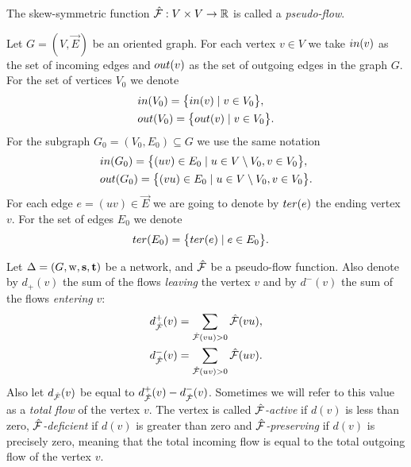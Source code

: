 \documentclass[12pt]{amsart}
\begin{document}
    \begin{definition}
        The skew-symmetric function $\mathcal{\hat{F}}: V \times V \to \mathbb{R}$ is called a \emph{pseudo-flow}.
    \end{definition}
    \begin{definition}
      Let $G = (V, \vec{E})$ be an oriented graph.
      For each vertex $v \in V$ we take $in(v)$ as the set of incoming edges
      and $out(v)$ as the set of outgoing edges in the graph $G$.
      For the set of vertices $V_0$ we denote
      \begin{align*}
        &in(V_0) = \big\{in(v) \mid v\in V_0\big\},\\
        &out(V_0) = \big\{out(v) \mid v\in V_0\big\}.
      \end{align*}
      For the subgraph $G_0 = (V_0, E_0) \subseteq G$ we use the same notation
      \begin{align*}
        &in(G_0) = \big\{(uv)\in E_0 \mid u \in V \setminus V_0, v \in V_0\big\},\\
        &out(G_0) = \big\{(vu) \in E_0 \mid u \in V\setminus V_0, v \in V_0\big\}.
      \end{align*}
      For each edge $e=(uv) \in \vec{E}$ we are going to denote %
        by $ter(e)$ the ending vertex $v$.
      For the set of edges $E_0$ we denote
      \begin{align*}
        &ter(E_0) = \big\{ter(e) \mid e\in E_0\big\}.
      \end{align*}
    \end{definition}
    \begin{definition}
      Let $\Delta = (G, \mathrm{w}, \mathbf{s}, \mathbf{t})$ be a network, and $\mathcal{\hat{F}}$ be a pseudo-flow function.
      Also denote by $d_{+}(v)$ the sum of the flows \emph{leaving} the vertex $v$ and by
      $d^{-}(v)$ the sum of the flows \emph{entering} $v$:
      \begin{align*}
        &d^{+}_{\mathcal{\hat{F}}}(v) = \sum_{\mathcal{\hat{F}}(vu) > 0} \mathcal{\hat{F}}(vu),\\
        &d^{-}_{\mathcal{\hat{F}}}(v) = \sum_{\mathcal{\hat{F}}(uv) > 0} \mathcal{\hat{F}}(uv).
      \end{align*}
      Also let $d_{\mathcal{\hat{F}}}(v)$ be equal to $d^{+}_{\mathcal{\hat{F}}}(v) - d^{-}_{\mathcal{\hat{F}}}(v)$.
      Sometimes we will refer to this value as a \emph{total flow} of the vertex $v$.
      The vertex is called \emph{$\mathcal{\hat{F}}$-active} if $d(v)$ is less than zero,
      \emph{$\mathcal{\hat{F}}$-deficient} if $d(v)$ is greater than zero and
      \emph{$\mathcal{\hat{F}}$-preserving} if $d(v)$ is precisely zero, meaning that the total incoming flow
      is equal to the total outgoing flow of the vertex $v$.
    \end{definition}
\end{document}
